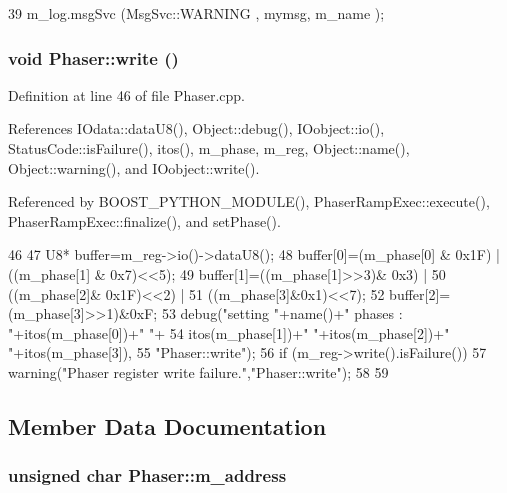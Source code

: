 \begin{DoxyCode}
39 { m_log.msgSvc (MsgSvc::WARNING , mymsg, m_name ); }
\end{DoxyCode}
\hypertarget{classPhaser_a7a94d4129a5f743c482fa97f3c5df68f}{
\subsubsection[{write}]{\setlength{\rightskip}{0pt plus 5cm}void Phaser::write ()}}
\label{classPhaser_a7a94d4129a5f743c482fa97f3c5df68f}


Definition at line 46 of file Phaser.cpp.

References IOdata::dataU8(), Object::debug(), IOobject::io(), StatusCode::isFailure(), itos(), m\_\-phase, m\_\-reg, Object::name(), Object::warning(), and IOobject::write().

Referenced by BOOST\_\-PYTHON\_\-MODULE(), PhaserRampExec::execute(), PhaserRampExec::finalize(), and setPhase().


\begin{DoxyCode}
46                   {
47   U8* buffer=m_reg->io()->dataU8();
48   buffer[0]=(m_phase[0] & 0x1F) | ((m_phase[1] & 0x7)<<5);
49   buffer[1]=((m_phase[1]>>3)& 0x3) |
50       ((m_phase[2]& 0x1F)<<2) |
51       ((m_phase[3]&0x1)<<7);
52   buffer[2]=(m_phase[3]>>1)&0xF;
53   debug("setting "+name()+" phases : "+itos(m_phase[0])+" "+
54       itos(m_phase[1])+" "+itos(m_phase[2])+" "+itos(m_phase[3]),
55       "Phaser::write");
56   if (m_reg->write().isFailure()){
57     warning("Phaser register write failure.","Phaser::write");
58   }
59 }
\end{DoxyCode}


\subsection{Member Data Documentation}
\hypertarget{classPhaser_a8395e4279ce87dc816e02dd684a9fa3a}{
\subsubsection[{m\_\-address}]{\setlength{\rightskip}{0pt plus 5cm}unsigned char {\bf Phaser::m\_\-address}}}
\label{classPhaser_a8395e4279ce87dc816e02dd684a9fa3a}


